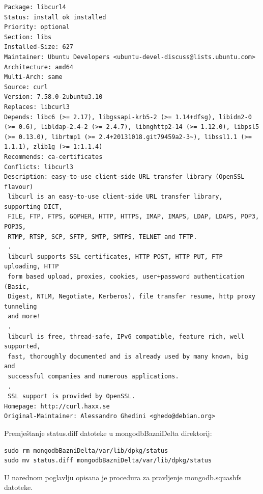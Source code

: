 \documentclass[12pt,vi]{mitthesis}
\begin{document}
\begin{lstlisting}[style=BashInputStyle]
Package: libcurl4
Status: install ok installed
Priority: optional
Section: libs
Installed-Size: 627
Maintainer: Ubuntu Developers <ubuntu-devel-discuss@lists.ubuntu.com>
Architecture: amd64
Multi-Arch: same
Source: curl
Version: 7.58.0-2ubuntu3.10
Replaces: libcurl3
Depends: libc6 (>= 2.17), libgssapi-krb5-2 (>= 1.14+dfsg), libidn2-0 (>= 0.6), libldap-2.4-2 (>= 2.4.7), libnghttp2-14 (>= 1.12.0), libpsl5 (>= 0.13.0), librtmp1 (>= 2.4+20131018.git79459a2-3~), libssl1.1 (>= 1.1.1), zlib1g (>= 1:1.1.4)
Recommends: ca-certificates
Conflicts: libcurl3
Description: easy-to-use client-side URL transfer library (OpenSSL flavour)
 libcurl is an easy-to-use client-side URL transfer library, supporting DICT,
 FILE, FTP, FTPS, GOPHER, HTTP, HTTPS, IMAP, IMAPS, LDAP, LDAPS, POP3, POP3S,
 RTMP, RTSP, SCP, SFTP, SMTP, SMTPS, TELNET and TFTP.
 .
 libcurl supports SSL certificates, HTTP POST, HTTP PUT, FTP uploading, HTTP
 form based upload, proxies, cookies, user+password authentication (Basic,
 Digest, NTLM, Negotiate, Kerberos), file transfer resume, http proxy tunneling
 and more!
 .
 libcurl is free, thread-safe, IPv6 compatible, feature rich, well supported,
 fast, thoroughly documented and is already used by many known, big and
 successful companies and numerous applications.
 .
 SSL support is provided by OpenSSL.
Homepage: http://curl.haxx.se
Original-Maintainer: Alessandro Ghedini <ghedo@debian.org>
\end{lstlisting}
\noindent
Premještanje status.diff datoteke u mongodbBazniDelta direktorij:
\begin{lstlisting}[style=BashInputStyle]
sudo rm mongodbBazniDelta/var/lib/dpkg/status
sudo mv status.diff mongodbBazniDelta/var/lib/dpkg/status
\end{lstlisting}
U narednom poglavlju opisana je procedura za pravljenje mongodb.squashfs datoteke.
\end{document}
